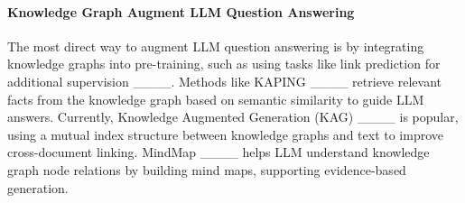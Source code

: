 \paragraph{Knowledge Graph Augment LLM Question Answering} 
The most direct way to augment LLM question answering is by integrating knowledge graphs into pre-training, such as using tasks like link prediction for additional supervision ____. Methods like KAPING ____ retrieve relevant facts from the knowledge graph based on semantic similarity to guide LLM answers. Currently, Knowledge Augmented Generation (KAG) ____ is popular, using a mutual index structure between knowledge graphs and text to improve cross-document linking. MindMap ____ helps LLM understand knowledge graph node relations by building mind maps, supporting evidence-based generation.

%